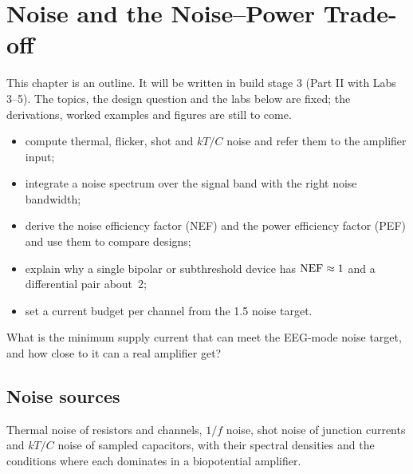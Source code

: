 \chapter{Noise and the Noise--Power Trade-off}\label{ch:noise}

\begin{specnote}
This chapter is an outline. It will be written in build stage 3 (Part II with Labs 3--5). The topics, the design question and the labs below are fixed; the derivations, worked examples and figures are still to come.
\end{specnote}

\begin{objectives}
\begin{itemize}
  \item compute thermal, flicker, shot and $kT/C$ noise and refer them to the amplifier input;
  \item integrate a noise spectrum over the signal band with the right noise bandwidth;
  \item derive the noise efficiency factor (NEF) and the power efficiency factor (PEF) and use them to compare designs;
  \item explain why a single bipolar or subthreshold device has $\mathrm{NEF} \approx 1$ and a differential pair about~2;
  \item set a current budget per channel from the \qty{1.5}{\uVrms} noise target.
\end{itemize}
\end{objectives}

\begin{insight}
What is the minimum supply current that can meet the EEG-mode noise target, and how close to it can a real amplifier get?
\end{insight}

\section{Noise sources}\label{sec:ch6-1}
Thermal noise of resistors and channels, $1/f$ noise, shot noise of junction currents and $kT/C$ noise of sampled capacitors, with their spectral densities and the conditions where each dominates in a biopotential amplifier.

